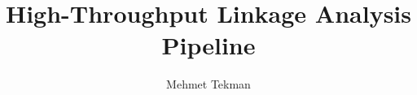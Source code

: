 \documentclass[11pt]{article} %
\author{Mehmet Tekman}
\title{High-Throughput Linkage Analysis Pipeline}
\begin{document}
\maketitle 

\pagebreak
\tableofcontents









\end{document}
